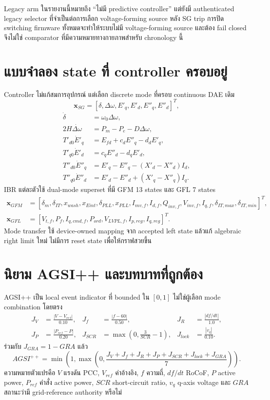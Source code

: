 \documentclass[12pt,a4paper]{article}
\newcommand{\vect}[1]{\boldsymbol{#1}}
\begin{document}
Legacy arm ในรายงานนี้หมายถึง ``ไม่มี predictive controller'' แต่ยังมี authenticated legacy selector ที่จำเป็นต่อการเลือก voltage-forming source หลัง SG trip การปิด switching firmware ทั้งหมดจะทำให้ระบบไม่มี voltage-forming source และต้อง fail closed จึงไม่ใช่ comparator ที่มีความหมายทางกายภาพสำหรับ chronology นี้

\section{แบบจำลอง state ที่ controller ครอบอยู่}
Controller ไม่แก้สมการอุปกรณ์ แต่เลือก discrete mode ที่ครอบ continuous DAE เดิม
\begin{equation}
\vect{x}_{SG}=[\delta,\Delta\omega,E'_q,E'_d,E''_q,E''_d]^T,
\end{equation}
\begin{align}
\dot\delta&=\omega_0\Delta\omega,\\
2H\dot{\Delta\omega}&=P_m-P_e-D\Delta\omega,\\
T'_{d0}\dot E'_q&=E_{fd}+c_dE''_q-d_dE'_q,\\
T'_{q0}\dot E'_d&=c_qE''_d-d_qE'_d,\\
T''_{d0}\dot E''_q&=E'_q-E''_q-(X'_d-X''_d)I_d,\\
T''_{q0}\dot E''_d&=E'_d-E''_d+(X'_q-X''_q)I_q.
\end{align}
IBR แต่ละตัวใช้ dual-mode superset ที่มี GFM 13 states และ GFL 7 states
\begin{align}
\vect{x}_{GFM}&=[\delta_m,\delta_{IT},x_{wash},x_{Eint},\delta_{PLL},x_{PLL},I_{mv,f},I_{d,f},Q_{inv,f},V_{inv,f},I_{q,f},\delta_{IT,max},\delta_{IT,min}]^T,\\
\vect{x}_{GFL}&=[V_{t,f},P_f,I_{q,cmd,f},P_{ord},V_{LVPL,f},I_{p,reg},I_{q,reg}]^T.
\end{align}
Mode transfer ใช้ device-owned mapping จาก accepted left state แล้วแก้ algebraic right limit ใหม่ ไม่มีการ reset state เพื่อให้กราฟสวยขึ้น

\section{นิยาม AGSI++ และบทบาทที่ถูกต้อง}
AGSI++ เป็น local event indicator ที่ bounded ใน $[0,1]$ ไม่ใช่ผู้เลือก mode combination โดยตรง
\begin{align}
J_V&=\frac{|V-V_{ref}|}{0.10},&J_f&=\frac{|f-60|}{0.50},&J_R&=\frac{|df/dt|}{1.0},\\
J_P&=\frac{|P_{ref}-P|}{0.20},&J_{SCR}&=\max\left(0,\frac{3}{SCR}-1\right),&J_{lock}&=\frac{|v_q|}{0.10}.
\end{align}
ร่วมกับ $J_{GRA}=1-GRA$ แล้ว
\begin{equation}
AGSI^{++}=\min\!\left(1,\max\!\left(0,\frac{J_V+J_f+J_R+J_P+J_{SCR}+J_{lock}+J_{GRA}}{7}\right)\right).
\end{equation}
ความหมายตัวแปรคือ $V$ แรงดัน PCC, $V_{ref}$ ค่าอ้างอิง, $f$ ความถี่, $df/dt$ RoCoF, $P$ active power, $P_{ref}$ คำสั่ง active power, $SCR$ short-circuit ratio, $v_q$ q-axis voltage และ $GRA$ สถานะว่ามี grid-reference authority หรือไม่
\end{document}
